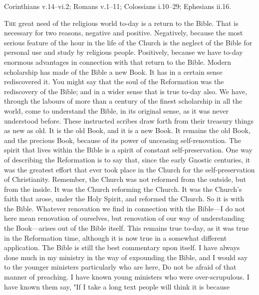 \documentclass[12pt,letterpaper,oneside]{book}
\begin{document}

\begin{center}
Corinthians v.14--vi.2; Romans v.1--11; Colossians i.10--29;
Ephesians ii.16. 
\end{center}


\textsc{The} great need of the religious world to-day 
is a return to the Bible. That is necessary 
for two reasons, negative and positive. Negatively,
because the most serious feature of the 
hour in the life of the Church is the neglect of 
the Bible for personal use and study by religious 
people. Positively, because we have to-day enormous 
advantages in connection with that return 
to the Bible. Modern scholarship has made of 
the Bible a new Book. It has in a certain sense 
rediscovered it. You might say that the soul 
of the Reformation was the rediscovery of the 
Bible; and in a wider sense that is true to-day 
also. We have, through the labours of more 
than a century of the finest scholarship in all 
the world, come to understand the Bible, in 
its original sense, as it was never understood 
before. These instructed scribes draw forth 
from their treasury things as new as old. It 
is the old Book, and it is a new Book. It 
remains the old Book, and the precious Book, 
because of its power of unceasing self-renovation. 
The spirit that lives within the Bible is 
a spirit of constant self-preservation. One way 
of describing the Reformation is to say that, 
since the early Gnostic centuries, it was the 
greatest effort that ever took place in the 
Church for the self-preservation of Christianity. 
Remember, the Church was not reformed from 
the outside, but from the inside. It was the 
Church reforming the Church. It was the 
Church's faith that arose, under the Holy Spirit, 
and reformed the Church. So it is with the 
Bible. Whatever renovation we find in connection 
with the Bible---I do not here mean renovation 
of ourselves, but renovation of our way of 
understanding the Book---arises out of the Bible 
itself. This remains true to-day, as it was true 
in the Reformation time, although it is now 
true in a somewhat different application. The 
Bible is still the best commentary upon itself. 
I have always done much in my ministry in 
the way of expounding the Bible, and I would 
say to the younger ministers particularly who are 
here, Do not be afraid of that manner of preaching. 
I have known young ministers who were 
over-scrupulous. I have known them say, "If I 
take a long text people will think it is because 
\end{document}

